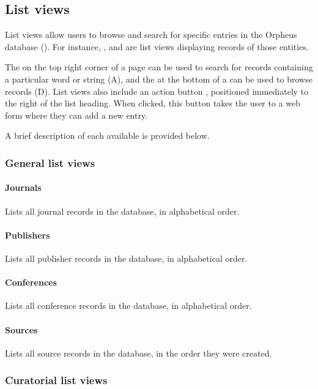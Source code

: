 \documentclass[british, 12pt]{article}
\begin{document}
\subsection{List views}
\label{sec-list-views}

List views allow users to browse and search for specific entries in the Orpheus database (). 
For instance, ,  and  are list views displaying records of those entities.

The  on the top right corner of a  page can be used to search for records containing a particular word or string (\figp{\ref{fig-journals}}A), and the  at the bottom of a  can be used to browse records (\figp{\ref{fig-journals}}D). List views also include an action button , positioned immediately to the right of the list heading. When clicked, this button takes the user to a web form where they can add a new entry.

A brief description of each available  is provided below.

\subsubsection{General list views}

\paragraph{Journals} Lists all journal records in the database, in alphabetical order.
\paragraph{Publishers} Lists all publisher records in the database, in alphabetical order.
\paragraph{Conferences} Lists all conference records in the database, in alphabetical order.
\paragraph{Sources} Lists all source records in the database, in the order they were created.

\subsubsection{Curatorial list views}
\end{document}
